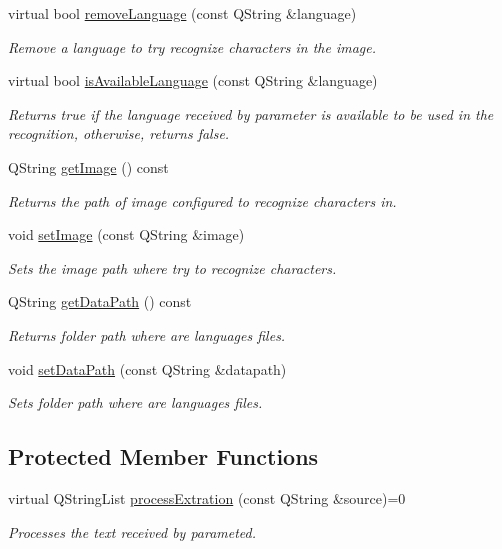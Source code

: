 \begin{DoxyCompactItemize}
virtual bool \mbox{\hyperlink{classOcr_a76001048da750374c987bef8171f1977}{remove\+Language}} (const Q\+String \&language)
\begin{DoxyCompactList}\small\item\em Remove a language to try recognize characters in the image. \end{DoxyCompactList}\item 
virtual bool \mbox{\hyperlink{classOcr_a0c9ebb9b531bdcd6789d4bf9cffb1d42}{is\+Available\+Language}} (const Q\+String \&language)
\begin{DoxyCompactList}\small\item\em Returns true if the language received by parameter is available to be used in the recognition, otherwise, returns false. \end{DoxyCompactList}\item 
Q\+String \mbox{\hyperlink{classOcr_a4bd4275b9b0503dd23dd553b4c0ef54c}{get\+Image}} () const
\begin{DoxyCompactList}\small\item\em Returns the path of image configured to recognize characters in. \end{DoxyCompactList}\item 
void \mbox{\hyperlink{classOcr_acdc41b9a0663c194d0fbede8c26ea319}{set\+Image}} (const Q\+String \&image)
\begin{DoxyCompactList}\small\item\em Sets the image path where try to recognize characters. \end{DoxyCompactList}\item 
Q\+String \mbox{\hyperlink{classOcr_a44f623335f8c26cc956b549a7bbf75fe}{get\+Data\+Path}} () const
\begin{DoxyCompactList}\small\item\em Returns folder path where are languages files. \end{DoxyCompactList}\item 
void \mbox{\hyperlink{classOcr_a0ec269340072accaa9d0932699b2a8ef}{set\+Data\+Path}} (const Q\+String \&datapath)
\begin{DoxyCompactList}\small\item\em Sets folder path where are languages files. \end{DoxyCompactList}\end{DoxyCompactItemize}
\subsection*{Protected Member Functions}
\begin{DoxyCompactItemize}
\item 
virtual Q\+String\+List \mbox{\hyperlink{classOcr_ac6f28693948e68e8958f1a27c73c79d1}{process\+Extration}} (const Q\+String \&source)=0
\begin{DoxyCompactList}\small\item\em Processes the text received by parameted. \end{DoxyCompactList}\end{DoxyCompactItemize}

